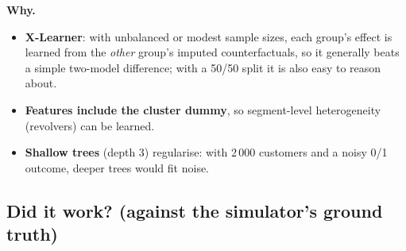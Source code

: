 \documentclass[11pt,a4paper]{article}
\newcommand{\why}[1]{\par\needspace{6\baselineskip}\smallskip\noindent\textbf{\textcolor{ca}{Why.}} #1\par}
\begin{document}
\why{
\begin{itemize}
\item \textbf{X-Learner}: with unbalanced or modest sample sizes, each group's effect is learned from the \emph{other} group's imputed counterfactuals, so it generally beats a simple two-model difference; with a 50/50 split it is also easy to reason about.
\item \textbf{Features include the cluster dummy}, so segment-level heterogeneity (revolvers) can be learned.
\item \textbf{Shallow trees} (depth 3) regularise: with 2\,000 customers and a noisy 0/1 outcome, deeper trees would fit noise.
\end{itemize}}

\subsection{Did it work? (against the simulator's ground truth)}
\end{document}
